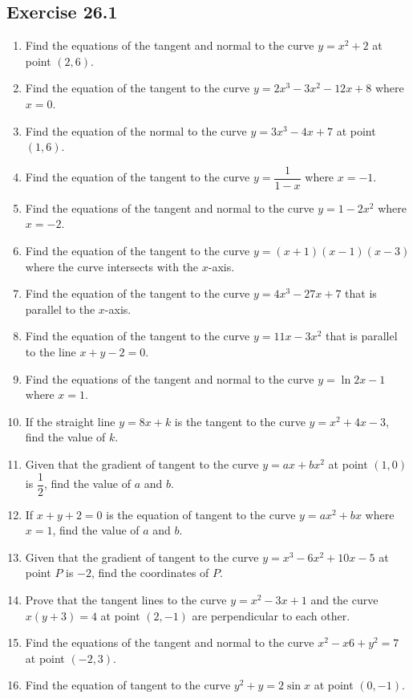 \documentclass{report}
\begin{document}
\subsection{Exercise 26.1}
\begin{enumerate}
    \item Find the equations of the tangent and normal to the curve $y = x^2 + 2$ at
          point $(2, 6)$.
    \item Find the equation of the tangent to the curve $y = 2x^3 - 3x^2 - 12x + 8$ where
          $x = 0$.
    \item Find the equation of the normal to the curve $y = 3x^3 - 4x + 7$ at point $(1,
              6)$.
    \item Find the equation of the tangent to the curve $y = \dfrac{1}{1-x}$ where $x =
              -1$.
    \item Find the equations of the tangent and normal to the curve $y = 1 - 2x^2$ where
          $x = -2$.
    \item Find the equation of the tangent to the curve $y = (x+1)(x-1)(x-3)$ where the
          curve intersects with the $x$-axis.
    \item Find the equation of the tangent to the curve $y = 4x^3 - 27x + 7$ that is
          parallel to the $x$-axis.
    \item Find the equation of the tangent to the curve $y = 11x - 3x^2$ that is parallel
          to the line $x + y - 2 = 0$.
    \item Find the equations of the tangent and normal to the curve $y = \ln{2x - 1}$
          where $x=1$.
    \item If the straight line $y = 8x + k$ is the tangent to the curve $y = x^2 + 4x -
              3$, find the value of $k$.
    \item Given that the gradient of tangent to the curve $y = ax + bx^2$ at point $(1,
              0)$ is $\dfrac{1}{2}$, find the value of $a$ and $b$.
    \item If $x + y + 2 = 0$ is the equation of tangent to the curve $y = ax^2 + bx$
          where $x = 1$, find the value of $a$ and $b$.
    \item Given that the gradient of tangent to the curve $y = x^3 - 6x^2 + 10x - 5$ at
          point $P$ is $-2$, find the coordinates of $P$.
    \item Prove that the tangent lines to the curve $y = x^2 - 3x + 1$ and the curve
          $x(y+3) = 4$ at point $(2, -1)$ are perpendicular to each other.
    \item Find the equations of the tangent and normal to the curve $x^2 - x6 + y^2 = 7$
          at point $(-2, 3)$.
    \item Find the equation of tangent to the curve $y^2 + y = 2\sin x$ at point $(0,
              -1)$.

\end{enumerate}
\end{document}

